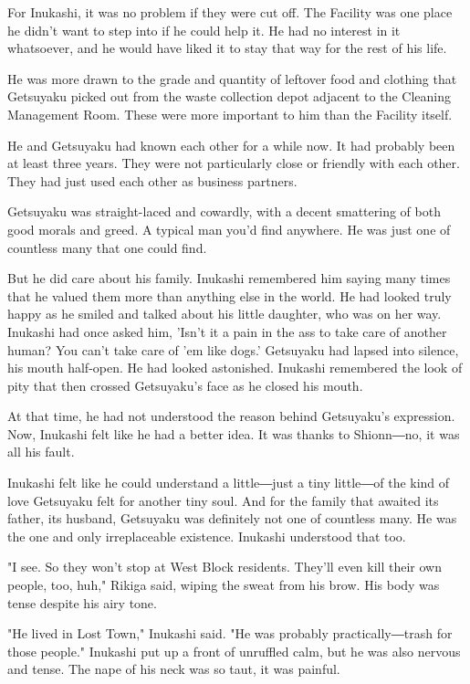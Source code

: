 For Inukashi, it was no problem if they were cut off. The Facility was
one place he didn't want to step into if he could help it. He had no
interest in it whatsoever, and he would have liked it to stay that way
for the rest of his life.

He was more drawn to the grade and quantity of leftover food and
clothing that Getsuyaku picked out from the waste collection depot
adjacent to the Cleaning Management Room. These were more important to
him than the Facility itself.

He and Getsuyaku had known each other for a while now. It had probably
been at least three years. They were not particularly close or friendly
with each other. They had just used each other as business partners.

Getsuyaku was straight-laced and cowardly, with a decent smattering of
both good morals and greed. A typical man you'd find anywhere. He was
just one of countless many that one could find.

But he did care about his family. Inukashi remembered him saying many
times that he valued them more than anything else in the world. He had
looked truly happy as he smiled and talked about his little daughter,
who was on her way. Inukashi had once asked him, 'Isn't it a pain in the
ass to take care of another human? You can't take care of 'em like
dogs.' Getsuyaku had lapsed into silence, his mouth half-open. He had
looked astonished. Inukashi remembered the look of pity that then
crossed Getsuyaku's face as he closed his mouth.

At that time, he had not understood the reason behind Getsuyaku's
expression. Now, Inukashi felt like he had a better idea. It was thanks
to Shionn―no, it was all his fault.

Inukashi felt like he could understand a little―just a tiny little―of
the kind of love Getsuyaku felt for another tiny soul. And for the
family that awaited its father, its husband, Getsuyaku was definitely
not one of countless many. He was the one and only irreplaceable
existence. Inukashi understood that too.

"I see. So they won't stop at West Block residents. They'll even kill
their own people, too, huh," Rikiga said, wiping the sweat from his
brow. His body was tense despite his airy tone.

"He lived in Lost Town," Inukashi said. "He was probably
practically―trash for those people." Inukashi put up a front of
unruffled calm, but he was also nervous and tense. The nape of his neck
was so taut, it was painful.

